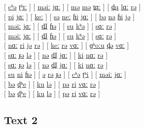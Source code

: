 \documentclass[17pt]{extarticle}
\begin{document}
[ \underline{cʰə} \underline{ʈʰɪː} ] [ \underline{məiː} \underline{jɑː} ] [ \underline{mə} \underline{mə} \underline{t̪ɑː} ] [ \underline{d̪u} \underline{lɑː} \underline{rə} ]\\

 [ \underline{pi} \underline{jɑː} ] [ \underline{keː} ] [ \underline{sə} \underline{neː} \underline{ɦi} \underline{jɑː} ] [ \underline{bə} \underline{nə} \underline{ɦi} \underline{jə} ]\\

[ \underline{məiː} \underline{jɑː} ] [ \underline{d̪I} \underline{ɦə} ] [ \underline{su} \underline{kʰə} ] [ \underline{sɑː} \underline{rə} ]\\

[ \underline{məiː} \underline{jɑː} ] [ \underline{d̪I} \underline{ɦə} ] [ \underline{su} \underline{kʰə} ] [ \underline{sɑː} \underline{rə} ]\\

 [ \underline{nɑː} \underline{ri} \underline{jə} \underline{rə} ] [ \underline{keː} \underline{rə} \underline{vɑː} ] [ \underline{ɡʰoːu} \underline{d̪ə} \underline{vɑː} ]\\

[ \underline{sɑː} \underline{ɟə} \underline{lə} ] [ \underline{nə} \underline{d̪I} \underline{jɑː} ] [ \underline{ki} \underline{nɑː} \underline{rə} ]\\

[ \underline{sɑː} \underline{ɟə} \underline{lə} ] [ \underline{nə} \underline{d̪I} \underline{jɑː} ] [ \underline{ki} \underline{nɑː} \underline{rə} ]\\

 [ \underline{su} \underline{ni} \underline{ɦə} ] [ \underline{ə} \underline{rə} \underline{ɟə} ] [ \underline{cʰə} \underline{ʈʰi} ] [ \underline{məiː} \underline{jɑː} ]\\

[ \underline{bə} \underline{ɖʰe} ] [ \underline{ku} \underline{lə} ] [ \underline{pə} \underline{ri} \underline{vɑː} \underline{rə} ]\\

[ \underline{bə} \underline{ɖʰe} ] [ \underline{ku} \underline{lə} ] [ \underline{pə} \underline{ri} \underline{vɑː} \underline{rə} ]\\

\subsection*{\textbf{Text 2}}
\end{document}
